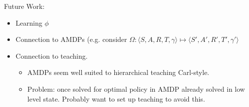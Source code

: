 \documentclass[11pt]{amsart}
\begin{document}
Future Work:
\begin{itemize}
\item Learning $\phi$
\item Connection to AMDPs (e.g. consider $\Omega : \langle S, A, R, T, \gamma \rangle \mapsto \langle S', A', R', T', \gamma' \rangle$
\item Connection to teaching.
\begin{itemize}
\item AMDPs seem well suited to hierarchical teaching Carl-style.
\item Problem: once solved for optimal policy in AMDP already solved in low level state. Probably want to set up teaching to avoid this.
\end{itemize}
\end{itemize}



\newpage

\end{document}
